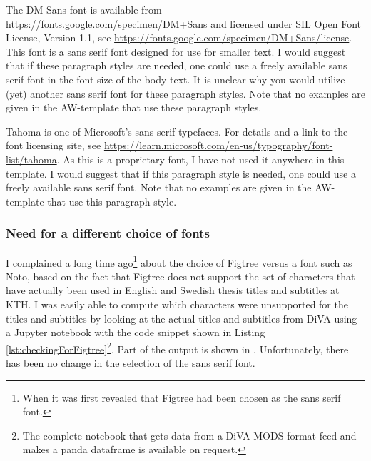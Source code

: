 \documentclass[12pt, twoside]{article}
\begin{document}
The DM Sans font is available from \url{https://fonts.google.com/specimen/DM+Sans} and licensed under SIL Open Font License, Version 1.1, see \url{https://fonts.google.com/specimen/DM+Sans/license}. This font is a sans serif font designed for use for smaller text. I would suggest that if these paragraph styles are needed, one could use a freely available sans serif font in the font size of the body text. It is unclear why you would utilize (yet) another sans serif font for these paragraph styles. Note that no examples are given in the AW-template that use these paragraph styles.

Tahoma is one of Microsoft's sans serif typefaces. For details and a link to the font licensing site, see \url{https://learn.microsoft.com/en-us/typography/font-list/tahoma}. As this is a proprietary font, I have not used it anywhere in this template. I would suggest that if this paragraph style is needed, one could use a freely available sans serif font. Note that no examples are given in the AW-template that use this paragraph style.

\subsubsection{Need for a different choice of fonts}
\label{sec:cycle3ChooseBetterFonts}
I complained a long time ago\footnote{When it was first revealed that Figtree had been chosen as the sans serif font.} about the choice of Figtree versus a font such as Noto, based on the fact that Figtree does not support the set of characters that have actually been used in English and Swedish thesis titles and subtitles at KTH. I was easily able to compute which characters were unsupported for the titles and subtitles by looking at the actual titles and subtitles from \gls{DiVA} using a Jupyter notebook with the code snippet shown in Listing \ref{lst:checkingForFigtree}\footnote{The complete notebook that gets data from a \gls{DiVA} \gls{MODS} format feed and makes a panda dataframe is available on request.}. Part of the output is shown in .
Unfortunately, there has been no change in the selection of the sans serif font. 
\end{document}
